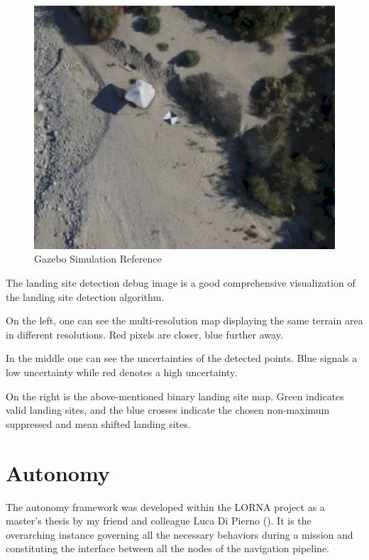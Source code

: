 \begin{figure}[ht!]
    \centering
    \includegraphics[scale=0.25]{images/system_overview/lsd_debug_reference.png}
    \caption{Gazebo Simulation Reference}
    \label{fig:lsd_debug_ref}
\end{figure}

The landing site detection debug image is a good comprehensive visualization of the landing site detection algorithm. 

On the left, one can see the multi-resolution map displaying the same terrain area in different resolutions. Red pixels are closer, blue further away.

In the middle one can see the uncertainties of the detected points. Blue signals a low uncertainty while red denotes a high uncertainty. 

On the right is the above-mentioned binary landing site map. Green indicates valid landing sites, and the blue crosses indicate the chosen non-maximum suppressed and mean shifted landing sites.   

\section{Autonomy}\label{sec:setup:autonomy}

The autonomy framework was developed within the LORNA project as a master's thesis by my friend and colleague Luca Di Pierno (\citep{Autonomy}). It is the overarching instance governing all the necessary behaviors during a mission and constituting the interface between all the nodes of the navigation pipeline.

